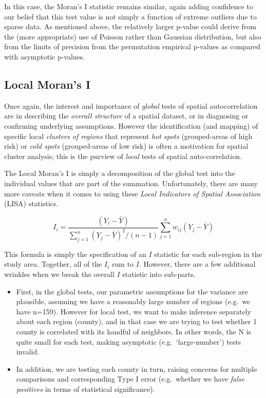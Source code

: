 \documentclass[
]{book}
\providecommand{\tightlist}{%
  \setlength{\itemsep}{0pt}\setlength{\parskip}{0pt}}
\begin{document}
In this case, the Moran's I statistic remains similar, again adding confidence to our belief that this test value is not simply a function of extreme outliers due to sparse data. As mentioned above, the relatively larger p-value could derive from the (more appropriate) use of Poisson rather than Gaussian distribution, but also from the limits of precision from the permutation empirical p-values as compared with asymptotic p-values.

\hypertarget{local-morans-i}{%
\subsection{Local Moran's I}\label{local-morans-i}}

Once again, the interest and importance of \emph{global} tests of spatial autocorrelation are in describing the \emph{overall structure} of a spatial dataset, or in diagnosing or confirming underlying assumptions. However the identification (and mapping) of specific local \emph{clusters of regions} that represent \emph{hot spots} (grouped-areas of high risk) or \emph{cold spots} (grouped-areas of low risk) is often a motivation for spatial cluster analysis; this is the purview of \emph{local} tests of spatial auto-correlation.

The Local Moran's I is simply a decomposition of the global test into the individual values that are part of the summation. Unfortunately, there are many more caveats when it comes to using these \emph{Local Indicators of Spatial Association} (LISA) statistics.

\[I_i = \frac{(Y_i-\bar Y)}{\sum\limits_{j=1}^{n}(Y_j-\bar Y)^2 / (n-1)} \sum\limits_{j=1}^{n}w_{ij}(Y_j-\bar Y)\]

This formula is simply the specification of an \(I\) statistic for each sub-region in the study area. Together, all of the \(I_i\) sum to \(I\). However, there are a few additional wrinkles when we break the overall \(I\) statistic into sub-parts.

\begin{itemize}
\tightlist
\item
  First, in the global tests, our parametric assumptions for the variance are plausible, assuming we have a reasonably large number of regions (e.g.~we have n=159). However for local test, we want to make inference separately about each region (county), and in that case we are trying to test whether 1 county is correlated with its handful of neighbors. In other words, the N is quite small for each test, making asymptotic (e.g.~`large-number') tests invalid.
\item
  In addition, we are testing each county in turn, raising concerns for multiple comparisons and corresponding Type I error (e.g.~whether we have \emph{false positives} in terms of statistical significance).
\end{itemize}
\end{document}
